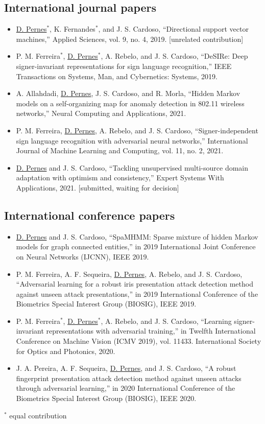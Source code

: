 \subsection{International journal papers}
\begin{itemize}
    \item \underline{D. Pernes$^*$}, K. Fernandes$^*$, and J. S. Cardoso, “Directional support vector
machines,” Applied Sciences, vol. 9, no. 4, 2019. [unrelated contribution]
    \item P. M. Ferreira$^*$, \underline{D. Pernes$^*$}, A. Rebelo, and J. S. Cardoso, “DeSIRe: Deep signer-invariant representations for sign language recognition,” IEEE Transactions on Systems, Man, and Cybernetics: Systems, 2019.
    \item A. Allahdadi, \underline{D. Pernes}, J. S. Cardoso, and R. Morla, “Hidden Markov models on
a self-organizing map for anomaly detection in 802.11 wireless networks,” Neural
Computing and Applications, 2021.
    \item P. M. Ferreira, \underline{D. Pernes}, A. Rebelo, and J. S. Cardoso, “Signer-independent sign language recognition with adversarial neural networks,” International Journal of Machine Learning and Computing, vol. 11, no. 2, 2021.
    \item \underline{D. Pernes} and J. S. Cardoso, “Tackling unsupervised multi-source domain adaptation with optimism and consistency,” Expert Systems With Applications, 2021. [submitted, waiting for decision]
\end{itemize}
\subsection{International conference papers}
\begin{itemize}
    \item \underline{D. Pernes} and J. S. Cardoso, “SpaMHMM: Sparse mixture of hidden Markov models for graph connected entities,” in 2019 International Joint Conference on Neural Networks (IJCNN), IEEE 2019.
    \item P. M. Ferreira, A. F. Sequeira, \underline{D. Pernes}, A. Rebelo, and J. S. Cardoso, “Adversarial
learning for a robust iris presentation attack detection method against unseen attack
presentations,” in 2019 International Conference of the Biometrics Special Interest Group
    (BIOSIG), IEEE 2019.
    \item P. M. Ferreira$^*$, \underline{D. Pernes$^*$}, A. Rebelo, and J. S. Cardoso, “Learning signer-invariant representations with adversarial training,” in Twelfth International Conference on Machine Vision (ICMV 2019), vol. 11433. International Society for Optics and Photonics, 2020.
    \item J. A. Pereira, A. F. Sequeira, \underline{D. Pernes}, and J. S. Cardoso, “A robust fingerprint presentation attack detection method against unseen attacks through adversarial learning,” in 2020 International Conference of the Biometrics Special Interest Group
    (BIOSIG), IEEE 2020.
\end{itemize}
\vspace{11pt}
$^*$ equal contribution

